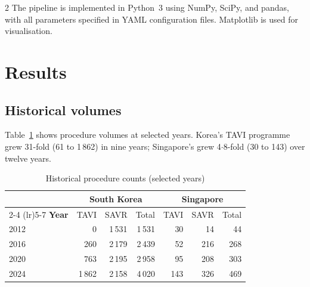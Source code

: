 \documentclass[10pt, a4paper]{article}
\begin{document}
\begin{multicols}{2}
The pipeline is implemented in Python~3 using NumPy, SciPy, and pandas, with all parameters specified in YAML configuration files. Matplotlib is used for visualisation.


\section{Results}

\subsection{Historical volumes}

Table~\ref{tab:historical} shows procedure volumes at selected years. Korea's TAVI programme grew 31-fold (61 to 1\,862) in nine years; Singapore's grew 4$\cdot$8-fold (30 to 143) over twelve years.

\end{multicols}

\begin{table}[H]
\centering
\caption{Historical procedure counts (selected years)}
\label{tab:historical}
\smallskip
\small
\begin{tabular}{@{}l rrr rrr@{}}
\toprule
& \multicolumn{3}{c}{\textbf{South Korea}} & \multicolumn{3}{c}{\textbf{Singapore}} \\
\cmidrule(lr){2-4} \cmidrule(lr){5-7}
\textbf{Year} & TAVI & SAVR & Total & TAVI & SAVR & Total \\
\midrule
2012 & 0     & 1\,531 & 1\,531 & 30  & 14  & 44  \\
2016 & 260   & 2\,179 & 2\,439 & 52  & 216 & 268 \\
2020 & 763   & 2\,195 & 2\,958 & 95  & 208 & 303 \\
2024 & 1\,862 & 2\,158 & 4\,020 & 143 & 326 & 469 \\
\bottomrule
\end{tabular}
\end{table}
\end{document}
